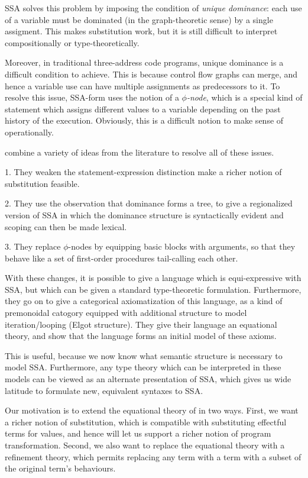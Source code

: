 \documentclass[acmsmall,screen,review]{acmart}
\begin{document}
SSA solves this problem by imposing the condition of \emph{unique dominance}: each use of a variable must be dominated (in the graph-theoretic sense) by a single assigment. This makes substitution work, but it is still difficult to interpret compositionally or type-theoretically.

Moreover, in traditional three-address code programs, unique dominance is a difficult condition to achieve. This is because control flow graphs can merge, and hence a variable use can have multiple assignments as predecessors to it. To resolve this issue, SSA-form uses the notion of a \emph{$\phi$-node}, which is a special kind of statement which assigns different values to a variable depending on the past history of the execution. Obviously, this is a difficult notion to make sense of operationally. 

\citet{ghalayini-24-ssa-densem-arxiv} combine a variety of ideas from
the literature to resolve all of these issues.

1. They weaken the statement-expression distinction make a richer notion of substitution feasible.

2. They use the observation that dominance forms a tree, to give a regionalized version of SSA in which the dominance structure is syntactically evident and scoping can then be made lexical.

3. They replace $\phi$-nodes by equipping basic blocks with arguments, so that they behave like a set of first-order procedures tail-calling each other.

With these changes, it is possible to give a language which is equi-expressive with SSA, but which can be given a standard type-theoretic formulation. Furthermore, they go on to give a categorical axiomatization of this language, as a kind of premonoidal catogory equipped with additional structure to model iteration/looping (Elgot structure). They give their language an equational theory, and show that the language forms an initial model of these axioms.

This is useful, because we now know what semantic structure is necessary to model SSA. Furthermore, any type theory which can be interpreted in these models can be viewed as an alternate presentation of SSA, which gives us wide latitude to formulate new, equivalent syntaxes to SSA.

Our motivation is to extend the equational theory of \cite{ghalayini-24-ssa-densem-arxiv} in two ways. First, we want a richer notion of substitution, which is compatible with substituting effectful terms for values, and hence will let us support a richer notion of program transformation. Second, we also want to replace the equational theory with a refinement theory, which permits replacing any term with a term with a subset of the original term's behaviours.
\end{document}
